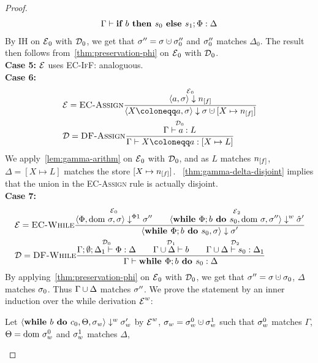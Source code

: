 \begin{proof}
\begin{align*}
        {\Gamma \vdash {\textbf{if }{b} \textbf{ then }{s_0}\textbf{ else }{s_1};{\Phi}}: \Delta}
    \end{align*}
    By IH on $\operatorname{\mathcal{E}}_0$ with $\operatorname{\mathcal{D}}_0$, we get that $\store'' = \store \dunion \store''_0$ and 
    $\sigma''_0$ matches $\Delta_0$.
    The result then follows from~\autoref{thm:preservation-phi} on $\operatorname{\mathcal{E}}_0$ with $\operatorname{\mathcal{D}}_0$.\\
    \textbf{Case 5:}
    $\operatorname{\mathcal{E}}$ uses \textsc{EC-IfF}: analoguous.\\
    \textbf{Case 6:}
    \begin{align*}
        &\E = \bsrule{EC-Assign}{\overset{\E_0}{\bigstep{a}{\store}{\flagged{}}}}
        {\bigstep{\defaultstore}{\store}{\storeassign{\store}{X \mapsto \flagged{}}}}\\
        &\D = \rule{DF-Assign}{\overset{\D_0}{\typestep{\Gamma}{a}{L}}}
        {\typestep{\Gamma}{\defaultstore}{[X \mapsto L]}}
    \end{align*}
    We apply~\autoref{lem:gamma-arithm} on $\operatorname{\mathcal{E}}_0$ with $\operatorname{\mathcal{D}}_0$,
    and as $L$ matches $\flagged{}$, $\Delta = [X \mapsto L]$ matches the store
    $[X \mapsto \flagged{}]$.
    ~\autoref{thm:gamma-delta-disjoint} implies that the union in the \textsc{EC-Assign}
    rule is actually disjoint.
    \\
    \textbf{Case 7:}\\
    \begin{align*}
        &\operatorname{\mathcal{E}} = \textsc{EC-While}\frac{\displaystyle \overset{\operatorname{\mathcal{E}}_0}{\langle \Phi, \text{dom }{\sigma}, \sigma \rangle \downarrow^{\Phi1} \sigma''}\qquad
        \overset{\operatorname{\mathcal{E}}_2}{\langle \textbf{while }\Phi;{b} \textbf{ do } {s_0}, \text{dom }{\sigma}, \sigma'' \rangle \downarrow^w \hat{\sigma}'}}{\displaystyle \langle \textbf{while }\Phi;{b} \textbf{ do } {s_0}, \sigma \rangle \downarrow \sigma'}\\
        &\operatorname{\mathcal{D}} = \textsc{DF-While}\frac{\displaystyle \overset{\operatorname{\mathcal{D}}_0}{\Gamma;\emptyset;\Delta_1 \vdash {\Phi}: \Delta}\qquad
        \overset{\operatorname{\mathcal{D}}_1}{\Gamma \cup \Delta \vdash {b}}\qquad
        \overset{\operatorname{\mathcal{D}}_2}{\Gamma \cup \Delta \vdash {s_0}: \Delta_1}}{\displaystyle \Gamma \vdash {\textbf{while }\Phi;{b} \textbf{ do } {s_0}}: \Delta}
    \end{align*}
    By applying~\autoref{thm:preservation-phi} on $\operatorname{\mathcal{E}}_0$ with $\operatorname{\mathcal{D}}_0$, we get that
    $\store'' = \store \dunion \store_0$, $\Delta$ matches $\sigma_0$.
    Thus $\Gamma \cup \Delta$ matches $\sigma''$.
    We prove the statement by an inner induction over the while derivation $\operatorname{\mathcal{E}}^w$:
    \begin{claim}
        Let $\langle \textbf{while }{b} \textbf{ do } {c_0}, \Theta, \sigma_w \rangle \downarrow^w \sigma_w'$ by $\operatorname{\mathcal{E}}^w$,
         $\store_w = \store_w^0 \dunion \store_w^1$
        such that $\sigma_w^0$ matches $\Gamma$, $\Theta = \text{dom }{\sigma}^0_w$ and $\sigma_w^1$ matches $\Delta$,

\end{claim}
\end{proof}
